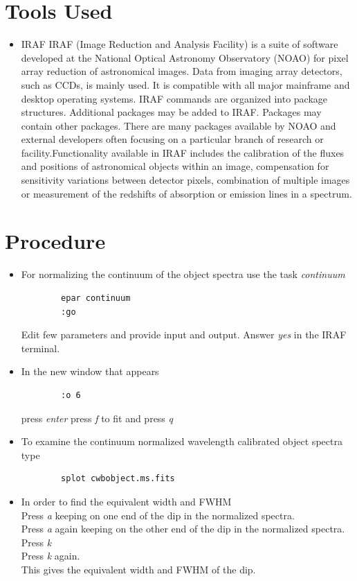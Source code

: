 \documentclass[letterpaper,11pt]{report}
\begin{document}
\section{Tools Used}
\begin{itemize}
    \item IRAF
    \newline
    IRAF (Image Reduction and Analysis Facility) is a suite of software developed at the National Optical Astronomy Observatory (NOAO) for pixel array reduction of astronomical images. Data from imaging array detectors, such as CCDs, is mainly used. It is compatible with all major mainframe and desktop operating systems.
    IRAF commands are organized into package structures. Additional packages may be added to IRAF. Packages may contain other packages. There are many packages available by NOAO and external developers often focusing on a particular branch of research or facility.Functionality available in IRAF includes the calibration of the fluxes and positions of astronomical objects within an image, compensation for sensitivity variations between detector pixels, combination of multiple images or measurement of the redshifts of absorption or emission lines in a spectrum.
\end{itemize}

\section{Procedure}
\begin{itemize}
    \item For normalizing the continuum of the object spectra use the     task \emph{continuum}
        \begin{lstlisting}
        epar continuum
        :go
        \end{lstlisting}
        Edit few parameters and provide input and output. Answer \emph{yes} in the IRAF terminal.
    \item In the new window that appears
        \begin{lstlisting}
        :o 6
        \end{lstlisting}
        press \emph{enter}
        press \emph{f} to fit and press \emph{q}
    \item To examine the continuum normalized wavelength calibrated       object spectra type
        \begin{lstlisting}
        splot cwbobject.ms.fits
        \end{lstlisting}
    \item In order to find the equivalent width and FWHM\\
          Press \emph{a} keeping on one end of the dip in the normalized spectra.\\
        Press \emph{a} again keeping on the other end of the dip in the normalized spectra.\\
        Press \emph{k}\\
        Press \emph{k} again.\\
        This gives the equivalent width and FWHM of the dip.
\end{itemize}
\end{document}

